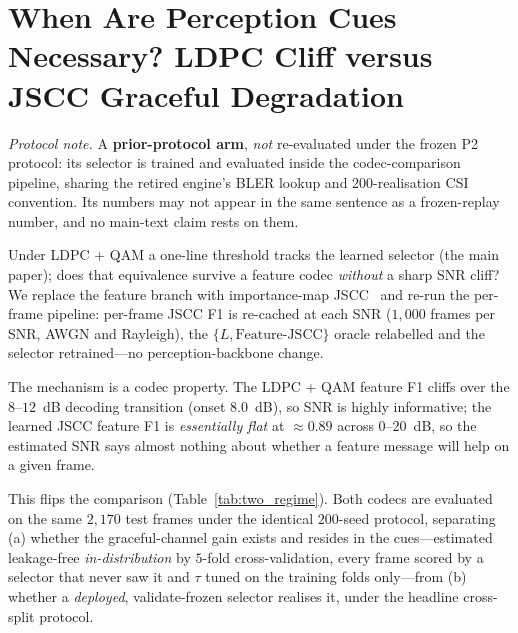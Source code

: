 \documentclass[journal]{IEEEtran}
\begin{document}
\section{When Are Perception Cues Necessary? LDPC Cliff versus JSCC Graceful Degradation}\label{sec:jscc_aware}

\noindent\emph{Protocol note.} A \textbf{prior-protocol arm}, \emph{not} re-evaluated under the frozen P2 protocol: its selector is trained and evaluated inside the codec-comparison pipeline, sharing the retired engine's BLER lookup and $200$-realisation CSI convention. Its numbers may not appear in the same sentence as a frozen-replay number, and no main-text claim rests on them.

Under LDPC + QAM a one-line threshold tracks the learned selector (the main paper); does that equivalence survive a feature codec \emph{without} a sharp SNR cliff? We replace the feature branch with importance-map JSCC~\cite{sheng2024importance} and re-run the per-frame pipeline: per-frame JSCC F1 is re-cached at each SNR ($1{,}000$ frames per SNR, AWGN and Rayleigh), the $\{L,\text{Feature-JSCC}\}$ oracle relabelled and the selector retrained---no perception-backbone change.

The mechanism is a codec property. The LDPC + QAM feature F1 cliffs over the $8$--$12$~dB decoding transition (onset $8.0$~dB), so SNR is highly informative; the learned JSCC feature F1 is \emph{essentially flat} at $\approx 0.89$ across $0$--$20$~dB, so the estimated SNR says almost nothing about whether a feature message will help on a given frame.

This flips the comparison (Table~\ref{tab:two_regime}). Both codecs are evaluated on the same $2{,}170$ test frames under the identical $200$-seed protocol, separating (a) whether the graceful-channel gain exists and resides in the cues---estimated leakage-free \emph{in-distribution} by $5$-fold cross-validation, every frame scored by a selector that never saw it and $\tau$ tuned on the training folds only---from (b) whether a \emph{deployed}, validate-frozen selector realises it, under the headline cross-split protocol.
\end{document}
